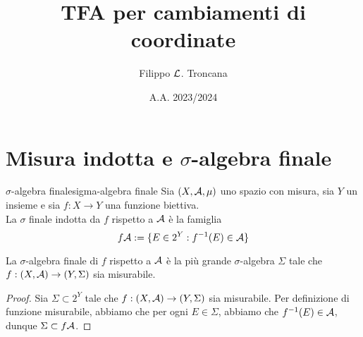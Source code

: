\documentclass{article}
\title{TFA per cambiamenti di coordinate}
\author{Filippo $\mathcal{L}$. Troncana}
\date{A.A. 2023/2024}
\begin{document}
\maketitle

\section{Misura indotta e $\sigma$-algebra finale}

\begin{definition}{$\sigma$-algebra finale}{sigma-algebra finale}
    Sia $(X,\mathcal{A},\mu)$ uno spazio con misura, sia $Y$ un insieme e sia $f:X\to Y$ una funzione biettiva.\\
    La $\sigma$ finale indotta da $f$ rispetto a $\mathcal{A}$ è la famiglia
    \[f\mathcal{A} := \{E \in 2^Y : f^{-1}(E) \in \mathcal{A}\}\]
\end{definition}
\begin{remark}{}{}
    La $\sigma$-algebra finale di $f$ rispetto a $\mathcal{A}$ è la più grande $\sigma$-algebra $\Sigma$ tale che $f : (X,\mathcal{A})\to (Y,\Sigma)$ sia misurabile.
    \begin{proof}
        Sia $\Sigma \subset 2^Y$ tale che $f : (X,\mathcal{A})\to (Y,\Sigma)$ sia misurabile. Per definizione di funzione misurabile, abbiamo che per ogni $E \in \Sigma$, abbiamo che $f^{-1}(E)\in \mathcal{A}$, dunque $\Sigma\subset f\mathcal{A}$.
    \end{proof}
\end{remark}
\end{document}
